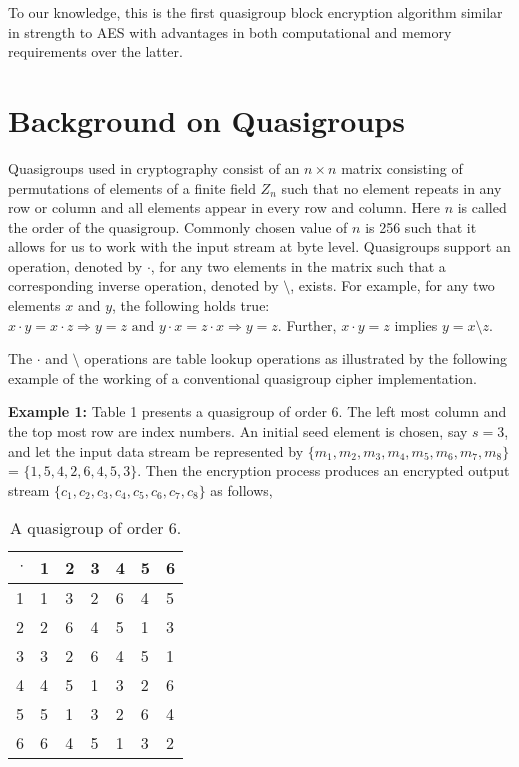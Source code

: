 \documentclass[conference]{IEEEtran}
\begin{document}
To our knowledge, this is the first quasigroup block encryption algorithm similar in strength to AES with advantages in both computational and memory requirements over the latter.

\section{Background on Quasigroups}
Quasigroups used in cryptography consist of an $n\times n$ matrix consisting of permutations of elements of a finite field $Z_n$ such that no element repeats in any row or column and all elements appear in every row and column. Here $n$ is called the order of the quasigroup. Commonly chosen value of $n$ is 256 such that it allows for us to work with the input stream at byte level. Quasigroups support an operation, denoted by $\cdot$, for any two elements in the matrix such that a corresponding inverse operation, denoted by $\setminus$, exists. For example, for any two elements $x$ and $y$, the following holds true: $x\cdot y = x\cdot z \Rightarrow y=z \mbox{ and } y\cdot x = z\cdot x \Rightarrow y=z$. Further, $x\cdot y = z$ implies $y=x\setminus z$.

The $\cdot$ and $\setminus$ operations are table lookup operations as illustrated by the following example of the working of a conventional quasigroup cipher implementation.

\textbf{Example 1:} Table 1 presents a quasigroup of order 6. The left most column and the top most row are index numbers. An initial seed element is chosen, say $s=3$, and let the input data stream be represented by $\{m_1, m_2, m_3, m_4, m_5, m_6, m_7, m_8\}$ = $\{1,5,4,2,6,4,5,3\}$. Then the encryption process produces an encrypted output stream $\{c_1, c_2, c_3, c_4, c_5, c_6, c_7, c_8\}$ as follows,

\begin{table}
\centering\label{tableQG}
\begin{tabular}{|r|l|l|l|l|l|l|}
\hline
$\cdot$& 1&  2&  3&  4&  5&  6\\ \hline
1& 1&  3&  2&  6&  4&  5\\ \hline
2& 2&  6&  4&  5&  1&  3\\ \hline
3& 3&  2&  6&  4&  5&  1\\ \hline
4& 4&  5&  1&  3&  2&  6\\ \hline
5& 5&  1&  3&  2&  6&  4\\ \hline
6& 6&  4&  5&  1&  3&  2\\ \hline
\end{tabular}
\caption{A quasigroup of order 6.}
\end{table}
\end{document}
